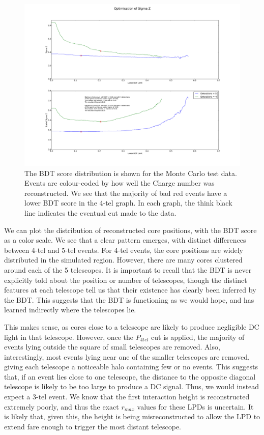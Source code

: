 \documentclass[11pt]{article}
\begin{document}
\begin{figure}
\begin{center}
\includegraphics[width=\textwidth]{Zcuts}
\caption{The BDT score distribution is shown for the Monte Carlo test data. Events are colour-coded by how well the Charge number was reconstructed. We see that the majority of bad red events have a lower BDT score in the 4-tel graph. In each graph, the think black line indicates the eventual cut made to the data.}
\label{fig:Zcuts}
\end{center}
\end{figure}

We can plot the distribution of reconstructed core positions, with the BDT score as a color scale. We see that a clear pattern emerges, with distinct differences between 4-tel and 5-tel events. For 4-tel events, the core positions are widely distributed in the simulated region. However, there are many cores clustered around each of the 5 telescopes. It is important to recall that the BDT is never explicitly told about the position or number of telescopes, though the distinct features at each telescope tell us that their existence has clearly been inferred by the BDT. This suggests that the BDT is functioning as we would hope, and has learned indirectly where the telescopes lie. 

This makes sense, as cores close to a telescope are likely to produce negligible DC light in that telescope. However, once the $P_{4tel}$ cut is applied, the majority of events lying outside the square of small telescopes are removed. Also, interestingly, most events lying near one of the smaller telescopes are removed, giving each telescope a noticeable halo containing few or no events. This suggests that, if an event lies close to one telescope, the distance to the opposite diagonal telescope is likely to be too large to produce a DC signal. Thus, we would instead expect a 3-tel event. We know that the first interaction height is reconstructed extremely poorly, and thus the exact $r_{max}$ values for these LPDs is uncertain. It is likely that, given this, the height is being misreconstructed to allow the LPD to extend fare enough to trigger the most distant telescope.
\end{document}
